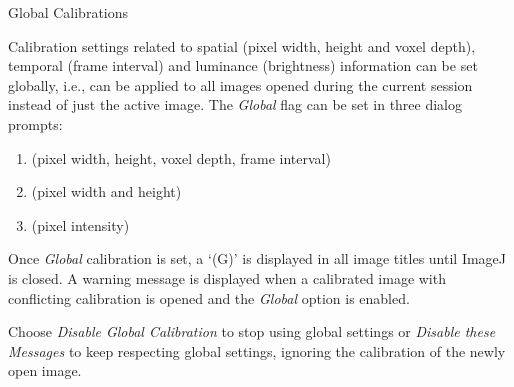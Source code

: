 
\begin{infobox}
\caption{\label{infobox:GlobalCal}Global Calibrations}


Calibration
settings related to spatial (pixel width, height and voxel depth),
temporal (frame interval) and luminance (brightness) information can
be set globally, i.e., can be applied to all images opened during
the current session instead of just the active image. The \emph{Global}
flag can be set in three dialog prompts:
\begin{enumerate}
\item {}
(pixel width, height, voxel depth, frame interval)
\item {} (pixel
width and height)
\item {} (pixel
intensity)
\end{enumerate}
{\small }%
\begin{minipage}[c][1\totalheight][t]{0.37\columnwidth}%
%
\end{minipage}{\small }%
\begin{minipage}[c][1\totalheight][t]{0.63\columnwidth}%
Once \emph{Global} calibration is set, a `(G)' is displayed in all
image titles until ImageJ is closed. A warning message is displayed
when a calibrated image with conflicting calibration is opened and
the \emph{Global} option is enabled.

\medskip{}
Choose \emph{Disable Global Calibration} to stop using global settings
or \emph{Disable these Messages} to keep respecting global settings,
ignoring the calibration of the newly open image.%
\end{minipage}
\end{infobox}




